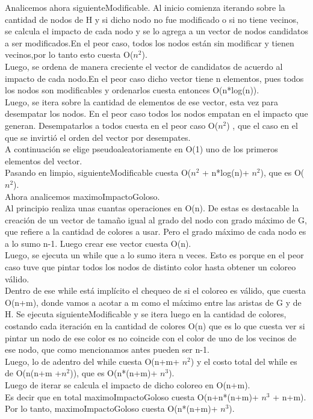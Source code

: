 \indent Analicemos ahora siguienteModificable. Al inicio comienza iterando sobre la cantidad de nodos de H y si dicho nodo no fue modificado o si no tiene vecinos, se calcula el impacto de cada nodo y se lo agrega a un vector de nodos candidatos a ser modificados.En el peor caso, todos los nodos están sin modificar y tienen vecinos,por lo tanto esto cuesta O($n^{2}$).\\
\indent Luego, se ordena de manera creciente el vector de candidatos de acuerdo al impacto de cada nodo.En el peor caso dicho vector tiene n elementos, pues todos los nodos son modificables y ordenarlos cuesta entonces O(n*log(n)).\\
\indent Luego, se itera sobre la cantidad de elementos de ese vector, esta vez para desempatar los nodos. En el peor caso todos los nodos empatan en el impacto que generan. Desempatarlos a todos cuesta en el peor caso O($n^{2}$) , que el caso en el que se invirtió el orden del vector por desempates.\\
\indent A continuación se elige pseudoaleatoriamente en O(1) uno de los primeros elementos del vector.\\
\indent Pasando en limpio, siguienteModificable cuesta O($n^2$ + n*log(n)+ $n^2$), que es O($n^{2}$).\\

\indent Ahora analicemos maximoImpactoGoloso.\\
\indent Al principio realiza unas cuantas operaciones en O(n). De estas es destacable la creación de un vector de tamaño igual al grado del nodo con grado máximo de G, que refiere a la cantidad de colores a usar. Pero el grado máximo de cada nodo es a lo sumo n-1. Luego crear ese vector cuesta O(n).\\
\indent Luego, se ejecuta un while que a lo sumo itera n veces. Esto es porque en el peor caso tuve que pintar todos los nodos de distinto color hasta obtener un coloreo válido.\\
\indent Dentro de ese while está implícito el chequeo de si el coloreo es válido, que cuesta O(n+m), donde vamos a acotar a m como el máximo entre las aristas de G y de H. Se ejecuta siguienteModificable y se itera luego en la cantidad de colores, costando cada iteración en la cantidad de colores O(n) que es lo que cuesta ver si pintar un nodo de ese color es no coincide con el color de uno de los vecinos de ese nodo, que como mencionamos antes pueden ser n-1.\\
\indent Luego, lo de adentro del while cuesta O(n+m+ $n^{2}$) y el costo total del while es de O(n(n+m +$n^{2}$)), que es O(n*(n+m)+ $n^{3}$).\\
\indent Luego de iterar se calcula el impacto de dicho coloreo en O(n+m).\\
\indent Es decir que en total maximoImpactoGoloso cuesta O(n+n*(n+m)+ $n^{3}$ + n+m).\\
\indent Por lo tanto, maximoImpactoGoloso cuesta O(n*(n+m)+ $n^{3}$).\\
 
